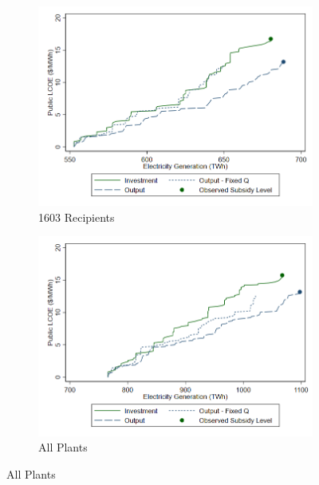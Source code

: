 \documentclass[12pt]{article}
\begin{document}
\begin{figure}[htb]
  \caption{Public LCOE vs Electricity Generation by Subsidy Type \label{fig:pub_lcoe}}
  \begin{center}%
  \begin{subfigure}[b]{0.495\textwidth}
    \caption{1603 Recipients \label{fig:pub_lcoe_1603}}
    \includegraphics[width=\textwidth]{plcoe_plot_1603plants.png}
  \end{subfigure} \hfill
  \begin{subfigure}[b]{0.495\textwidth}
    \caption{All Plants \label{fig:pub_lcoe_all}}
    \includegraphics[width=\textwidth]{plcoe_plot_all.png}
  \end{subfigure}
  \end{center}
  \vspace{-15pt}

\end{figure}
\end{document}
